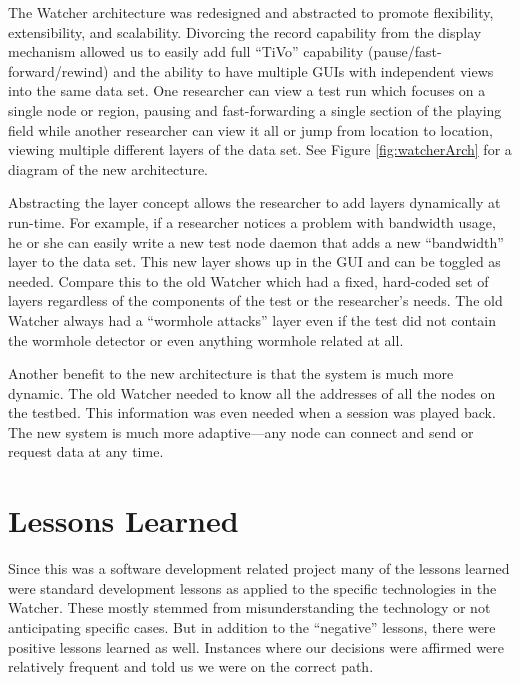 \documentclass{report}
\begin{document}
The Watcher architecture was redesigned and abstracted to promote flexibility, extensibility, and scalability.  Divorcing the record 
capability from the display mechanism allowed us to easily add full ``TiVo'' capability (pause\slash fast-forward\slash rewind) and the ability to have multiple 
GUIs with independent views into the same data set. One researcher can view a test run which focuses on a single node or region, 
pausing and fast-forwarding a single section of the playing field while another researcher can view it all or jump from 
location to location, viewing multiple different layers of the data set. See Figure \ref{fig:watcherArch} for a diagram 
of the new architecture.

Abstracting the layer concept allows the researcher to add layers dynamically at run-time. For example, 
if a researcher notices a problem with bandwidth usage, he or she can easily write a new test node daemon that 
adds a new ``bandwidth'' layer to the data set. This new layer shows up in the GUI and can be toggled as needed. 
Compare this to the old Watcher which had a fixed, hard-coded set of layers regardless of the components of the test
or the researcher's needs. The old Watcher always had a ``wormhole attacks'' layer even if the test did not 
contain the wormhole detector or even anything wormhole related at all. 

Another benefit to the new architecture is that the system is much more dynamic. The old Watcher needed to know all the addresses of all the nodes
on the testbed. This information was even needed when a session was played back. The new system is much more adaptive---any node can connect and 
send or request data at any time. 

\section{Lessons Learned}
Since this was a software development related project many of the lessons learned were standard development lessons as applied to the 
specific technologies in the Watcher. These mostly stemmed from misunderstanding the technology or not anticipating specific cases. 
But in addition to the ``negative'' lessons, there were positive lessons learned as well. Instances where our decisions were affirmed were
relatively frequent and told us we were on the correct path. 
\end{document}
